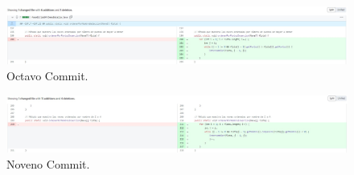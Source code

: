 \documentclass{article}
\begin{document}
\begin{figure}[H]
	\centering
	\includegraphics[width=1\textwidth,keepaspectratio]{img/commit08.jpg}
	\caption{Octavo Commit.}
\end{figure}
\begin{figure}[H]
	\centering
	\includegraphics[width=1\textwidth,keepaspectratio]{img/commit09.jpg}
	\caption{Noveno Commit.}
\end{figure}
\pagebreak
\end{document}
